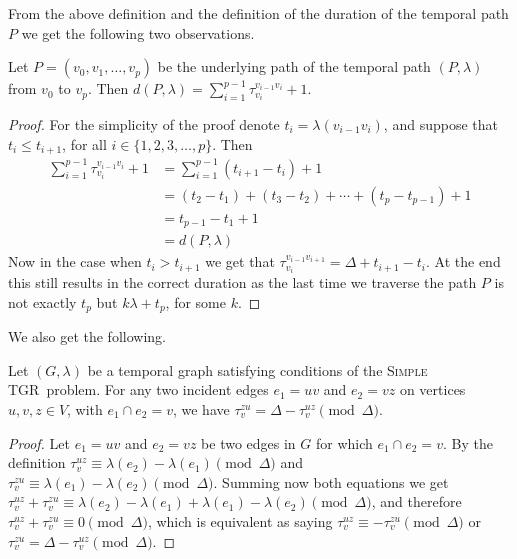 \documentclass[a4paper,UKenglish,cleveref, autoref, thm-restate]{lipics-v2021}
\newcommand{\deltaExact}{\textsc{Simple TGR}}
\begin{document}
    From the above definition and the definition of the duration of the temporal path $P$ we get the following two observations.
    \begin{observation}\label{obs:durationPwithWaitingTimes}
        Let $P = (v_0, v_1, \dots, v_p)$ be the underlying path of the temporal path
        $(P, \lambda)$ from $v_0$ to $v_p$.
        Then $d(P,\lambda) = \sum_{i = 1}^{p-1} \tau_{v_i}^{v_{i-1}v_i} + 1 $.
    \end{observation}
    \begin{proof}
        For the simplicity of the proof denote $t_i = \lambda(v_{i-1}v_i)$, and suppose that $t_i \leq t_{i+1}$, for all $i \in \{1,2,3,\dots,p\}$.
        Then
        \begin{align*}
        \sum_{i = 1}^{p-1} \tau_{v_i}^{v_{i-1}v_i} + 1  
        &= \sum _{i = 1}^{p-1} (t_{i+1} - t_i) + 1 \\
        & = (t_2 - t_1) + (t_3 - t_2) + \cdots + (t_p - t_{p-1}) + 1  \\
        & = t_{p-1} - t_1 + 1\\
        & = d(P, \lambda)
        \end{align*}
        Now in the case when $t_i > t_{i+1}$ we get that $\tau_{v_i}^{v_{i-1}v_{i+1}} = \Delta + t_{i+1} - t_i$.
        At the end this still results in the correct duration as the last time we traverse the path $P$ is not exactly $t_p$ but $k \lambda + t_p$, for some $k$.
    \end{proof}
    We also get the following.
    \begin{observation}\label{obs:travel-delays-both-directions}
    Let $(G, \lambda)$ be a temporal graph satisfying conditions of the \deltaExact\ problem.
    For any two incident edges $e_1 = uv$ and $e_2 = vz$ on vertices $u,v,z \in V$, with $e_1 \cap e_2 = v$, we have $\tau_v^{zu} = \Delta - \tau_v^{uz} \pmod \Delta$.
    \end{observation}
    
    \begin{proof}
        Let $e_1 = uv$ and $e_2 = vz$ be two edges in $G$ for which $e_1 \cap e_2 = v$. 
        By the definition $\tau_v^{uz} \equiv \lambda (e_2) - \lambda(e_1) \pmod \Delta$ and $\tau_v^{zu} \equiv \lambda (e_1) - \lambda(e_2) \pmod \Delta$.
        Summing now both equations we get $\tau_v^{uz} + \tau_v^{zu} \equiv \lambda(e_2) - \lambda(e_1) + \lambda (e_1) - \lambda(e_2) \pmod \Delta$, and therefore $\tau_v^{uz} + \tau_v^{zu} \equiv 0 \pmod \Delta$, which is equivalent as saying $\tau_v^{uz} \equiv - \tau_v^{zu} \pmod \Delta$ or $\tau_v^{zu} = \Delta - \tau_v^{uz} \pmod \Delta$.
    \end{proof}
\end{document}
